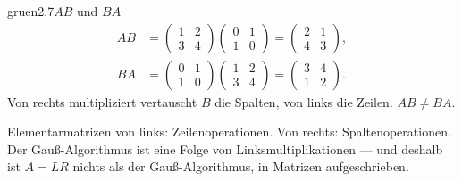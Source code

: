 \begin{loesungkarte}{gruen}{2.7}{$AB$ und $BA$}
\begin{align*} AB &= \begin{pmatrix}1 & 2\\ 3 & 4\end{pmatrix}\begin{pmatrix}0 & 1\\ 1 & 0\end{pmatrix} = \begin{pmatrix}2 & 1\\ 4 & 3\end{pmatrix},\\ BA &= \begin{pmatrix}0 & 1\\ 1 & 0\end{pmatrix}\begin{pmatrix}1 & 2\\ 3 & 4\end{pmatrix} = \begin{pmatrix}3 & 4\\ 1 & 2\end{pmatrix}. \end{align*}
Von rechts multipliziert vertauscht $B$ die Spalten, von links die Zeilen. $AB\neq BA$.
\begin{mitnehmen}\kastentext
Elementarmatrizen von links: Zeilenoperationen. Von rechts: Spaltenoperationen. Der Gauß-Algorithmus ist eine Folge von Linksmultiplikationen --- und deshalb ist $A = LR$ nichts als der Gauß-Algorithmus, in Matrizen aufgeschrieben.
\end{mitnehmen}
\end{loesungkarte}

